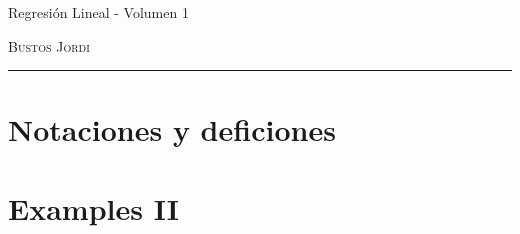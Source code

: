 \documentclass[12pt,a4paper]{book}
\begin{document}
\renewcommand{\contentsname}{\vspace{0cm} Contenido \vspace{-2cm}}

\begin{titlepage}
\vspace*{2cm}

\noindent
\vspace*{0.5cm}

\vspace{1.5cm}
\epigraph{Regresión Lineal - Volumen 1}%
{ \textsc{Bustos Jordi}}
\null\vfill
\vspace*{1cm}
\noindent
\hfill
\begin{minipage}{0.7\linewidth}
    \begin{flushright}
        \printauthor
    \end{flushright}
\end{minipage}
%
\begin{minipage}{0.02\linewidth}
    \rule{1pt}{70pt}
\end{minipage}
\titlepagedecoration
\end{titlepage}

\let\cleardoublepage=\clearpage
\tableofcontents
\blankpage

\chapter{Notaciones y deficiones}

\newpage\thispagestyle{empty}\blankpage

\chapter{Examples II}

\newpage\thispagestyle{empty}\blankpage


\blankpage


\nocite{*}
\end{document}
